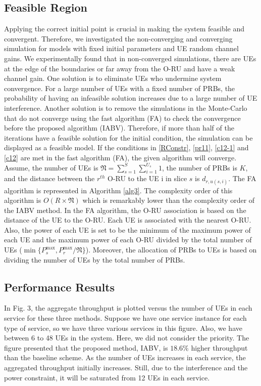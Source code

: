 \documentclass[lettersize,journal]{IEEEtran}
\begin{document}
\subsection{Feasible Region}\label{fr}
\vspace{-1mm}
Applying the correct initial point is crucial in making the system feasible and convergent.
Therefore, we investigated the non-converging and converging simulation for models with fixed initial parameters and UE random channel gains.
We experimentally found that in non-converged simulations, there are UEs at the edge of the boundaries or far away from the O-RU and have a weak channel gain. One solution is to eliminate UEs who undermine system convergence.
For a large number of UEs with a fixed number of PRBs, the probability of having an infeasible solution increases due to a large number of UE interference.
Another solution is to remove the simulations in the Monte-Carlo that do not converge using the fast algorithm (FA) to check the convergence before
the proposed algorithm (IABV).
Therefore, if more than half of the iterations have a feasible solution for the initial condition, the simulation can be displayed as a feasible model.
If the conditions in \eqref{RConstr}, \eqref{pr11}, \eqref{c12-1} and \eqref{c12} are met in the fast algorithm (FA), the given algorithm will converge.
Assume, the number of UEs is $\mathfrak{N} = \sum_{s=1}^{S}\sum_{i=1}^{U_s}1$,
the number of PRBs is $K$, and the distance between the $r^{th}$ O-RU to the UE i in slice $s$ is $d_{r,u(s,i)}$.
The FA algorithm is represented in Algorithm \ref{alg3}.
The complexity order of this algorithm is $O(R\times \mathfrak{N})$ which is remarkably lower than the complexity order of the IABV method.
In the FA algorithm, the O-RU association is based on the distance of the UE to the O-RU.
Each UE is associated with the nearest O-RU. Also, the power of each UE is set to be the minimum of the maximum power of each UE and the maximum power of each O-RU divided by the total number of UEs ($\min\{P_s^{\max}, P_r^{\max}/\mathfrak{N}\}$).
Moreover, the allocation of PRBs to UEs is based on dividing the number of UEs by the total number of PRBs.
\vspace*{-3mm}
\subsection{Performance Results}
\vspace*{-1mm}
In Fig. 3, the aggregate throughput is plotted versus the number of UEs in each service for these three methods. Suppose we have one service instance for each type of service, so we have three various services in this figure. Also, we have between 6 to 48 UEs in the system.
Here, we did not consider the priority. The figure presented that the proposed method, IABV, is $18.6\%$ higher throughput than the baseline scheme.
As the number of UEs increases in each service, the aggregated throughput initially increases. Still, due to the interference and the power constraint, it will be saturated from 12 UEs in each service.
\end{document}
